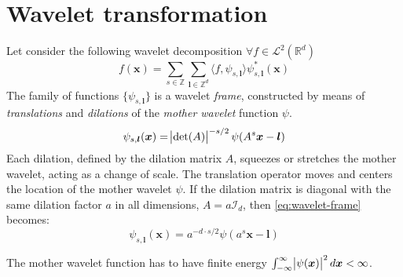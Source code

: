 \documentclass{InsightArticle}
\theoremstyle{definition}
\newcommand{\conj}[1]{#1^{\ast}}
\begin{document}
\section{Wavelet transformation}

Let consider the following wavelet decomposition $\forall f \in \mathcal{L}^2(\mathbb{R}^d)$
\begin{equation}
    f(\bm{x}) = \sum_{s \in \mathbb{Z}} \sum_{\bm{l} \in \mathbb{Z}^d} \langle f,\psi_{s,\bm{l}} \rangle \conj\psi_{s,\bm{l}}(\bm{x})
\end{equation}
The family of functions $\{\psi_{s,\bm{l}}\}$ is a wavelet \textit{frame}, constructed by means of \textit{translations} and \textit{dilations} of the \textit{mother wavelet} function $\psi$.
\begin{equation}
    \psi_{s,\bm{l}}(\bm{x}) = \abs{\det(A)}^{-s/2}\psi(A^s\bm{x} - \bm{l})
\label{eq:wavelet-frame}
\end{equation}
Each dilation, defined by the dilation matrix $A$, squeezes or stretches the mother wavelet, acting as a change of scale. The translation operator moves and centers the location of the mother wavelet $\psi$. If the dilation matrix is diagonal with the same dilation factor $a$ in all dimensions, $A = a \mathcal{I}_d$, then \autoref{eq:wavelet-frame} becomes:
\begin{equation}
    \psi_{s,\bm{l}}(\bm{x}) = a^{-d\cdot s/2}\psi(a^s\bm{x} - \bm{l})
\end{equation}

The mother wavelet function has to have finite energy $\int_{-\infty}^{\infty}\abs{\psi(\bm{x})}^2 d\bm{x} < \infty $.\newline
\end{document}
